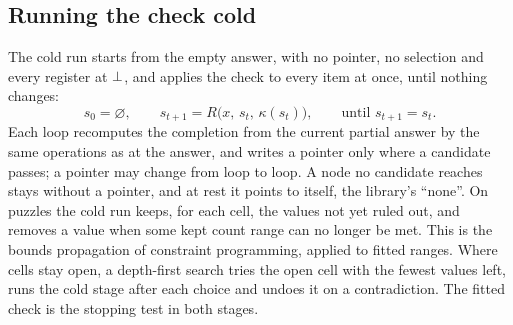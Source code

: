 \subsection{Running the check cold}

The cold run starts from the empty answer, with no pointer, no selection and every register at $\bot$, and applies
the check to every item at once, until nothing changes:
\begin{equation}
s_0 = \varnothing, \qquad s_{t+1} = R\bigl(x,\, s_t,\, \kappa(s_t)\bigr), \qquad \text{until } s_{t+1} = s_t .
\label{eq:run}
\end{equation}
Each loop recomputes the completion from the current partial answer by the same operations as at the answer, and writes
a pointer only where a candidate passes; a pointer may change from loop to loop. A node no candidate reaches stays
without a pointer, and at rest it points to itself, the library's ``none''. On puzzles the cold run keeps, for each cell,
the values not yet ruled out, and removes a value when some kept count range can no longer be met. This is the bounds
propagation of constraint programming\cite{rossi2006handbook}, applied to fitted ranges. Where cells stay open, a
depth-first search tries the open cell with the fewest values left, runs the cold stage after each choice and undoes it
on a contradiction. The fitted check is the stopping test in both stages.
